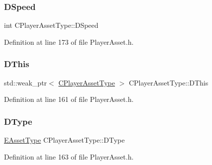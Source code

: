 \subsubsection{\texorpdfstring{D\+Speed}{DSpeed}}
{\footnotesize\ttfamily int C\+Player\+Asset\+Type\+::\+D\+Speed\hspace{0.3cm}{\ttfamily [protected]}}



Definition at line 173 of file Player\+Asset.\+h.

\hypertarget{classCPlayerAssetType_ae0d263de96ccad929d79d6b46f7b8deb}{}\label{classCPlayerAssetType_ae0d263de96ccad929d79d6b46f7b8deb} 
\subsubsection{\texorpdfstring{D\+This}{DThis}}
{\footnotesize\ttfamily std\+::weak\+\_\+ptr$<$ \hyperlink{classCPlayerAssetType}{C\+Player\+Asset\+Type} $>$ C\+Player\+Asset\+Type\+::\+D\+This\hspace{0.3cm}{\ttfamily [protected]}}



Definition at line 161 of file Player\+Asset.\+h.

\hypertarget{classCPlayerAssetType_a2a52bda918a79ecf5582314ef1f61c8a}{}\label{classCPlayerAssetType_a2a52bda918a79ecf5582314ef1f61c8a} 
\subsubsection{\texorpdfstring{D\+Type}{DType}}
{\footnotesize\ttfamily \hyperlink{GameDataTypes_8h_a5600d4fc433b83300308921974477fec}{E\+Asset\+Type} C\+Player\+Asset\+Type\+::\+D\+Type\hspace{0.3cm}{\ttfamily [protected]}}



Definition at line 163 of file Player\+Asset.\+h.

\hypertarget{classCPlayerAssetType_a1f87f6f8c42b692a500c875e9359a438}{}\label{classCPlayerAssetType_a1f87f6f8c42b692a500c875e9359a438} 
